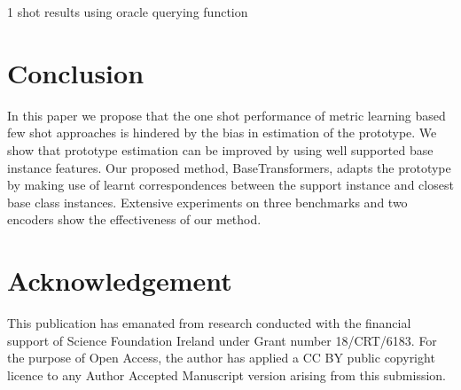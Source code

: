 \documentclass{bmvc2k}
\begin{document}
\begin{table}[]
\begin{minipage}{0.5\linewidth}
\caption{1 shot results using oracle querying function}
\label{table:oracle}

\end{minipage}\hspace{0.01\linewidth}\begin{minipage}{0.5\linewidth}

\caption{Ablation of various components of BaseTransformer}
\label{table:ablation}
\centering
{}
\end{minipage}
\end{table}

\section{Conclusion}

In this paper we propose that the one shot performance of metric learning based few shot approaches is hindered by the bias in estimation of the prototype. We show that prototype estimation can be improved by using well supported base instance features. Our proposed method, BaseTransformers, adapts the prototype by making use of learnt correspondences between the support instance and closest base class instances. Extensive experiments on three benchmarks and two encoders show the effectiveness of our method.

\section*{Acknowledgement}
This publication has emanated from research conducted with the financial
support of Science Foundation Ireland under Grant number 18/CRT/6183. For the purpose
of Open Access, the author has applied a CC BY public copyright licence to any
Author Accepted Manuscript version arising from this submission.


\end{document}
